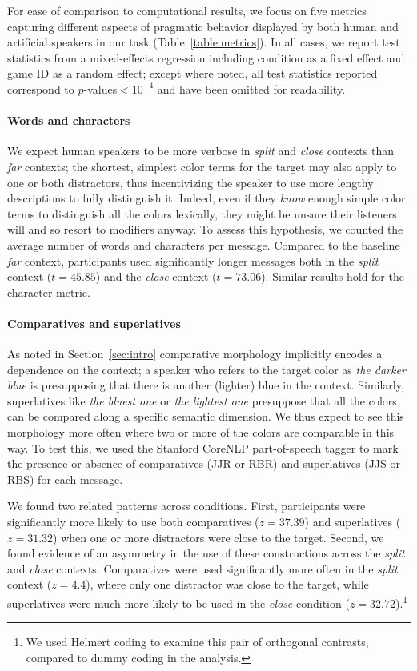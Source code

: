 \documentclass[11pt,letterpaper]{article}
\newcommand{\word}{\textit}
\renewcommand{\|}{\mid}
\newcommand{\secref}[1]{Section~\ref{#1}}
\newcommand{\tabref}[1]{Table~\ref{#1}}
\newcommand{\cond}{\emph}
\begin{document}
For ease of comparison to computational results, we focus on five
metrics capturing different aspects of pragmatic behavior
displayed by both human and artificial speakers in our task
(\tabref{table:metrics}). In all cases, we report test statistics from a mixed-effects regression including condition as a fixed effect and game ID as a random effect; except where noted, all test statistics reported correspond to $p$-values${}<10^{-4}$ and have been omitted for readability.

\paragraph{Words and characters}
We expect human speakers to be more verbose in \cond{split} and \cond{close} 
contexts than \cond{far} contexts; the shortest, simplest color terms for the target 
may also apply to one or both distractors, thus incentivizing the speaker to use more
lengthy descriptions to fully distinguish it. Indeed, even if they \emph{know} 
enough simple color terms to distinguish all the colors
lexically, they might be unsure their listeners will and so
resort to modifiers anyway. To assess this hypothesis,
we counted the average number of words and characters per message. 
Compared to the baseline \cond{far} context, participants used significantly longer messages both in the \cond{split} context ($t =  45.85$) and the \cond{close} context ($t = 73.06$). Similar results hold for the character metric.

\paragraph{Comparatives and superlatives}
As noted in \secref{sec:intro} comparative morphology implicitly
encodes a dependence on the context; a speaker who refers to the
target color as \word{the darker blue} is presupposing that there is
another (lighter) blue in the context. Similarly, superlatives like
\word{the bluest one} or \word{the lightest one} presuppose that all
the colors can be compared along a specific semantic dimension. We
thus expect to see this morphology more often where two or more of the
colors are comparable in this way. To test this, we used the Stanford
CoreNLP part-of-speech tagger \cite{Toutanova2003} to mark the presence or absence of comparatives (JJR or RBR) and superlatives (JJS or RBS) for each message. 

We found two related patterns across conditions. First, participants were significantly 
more likely to use both comparatives ($z = 37.39$) and superlatives ($z = 31.32$) 
when one or more distractors were close to the target. Second, we found evidence of 
an asymmetry in  the use of these constructions across the \cond{split} and 
\cond{close} contexts. Comparatives were used significantly more often in the 
\cond{split} context ($z = 4.4$), where only one distractor was close to the target, 
while superlatives were much more likely to be used in the \cond{close} condition 
($z = 32.72$).\footnote{We used Helmert coding to examine this pair of orthogonal 
contrasts, compared to dummy coding in the analysis.}
\end{document}
